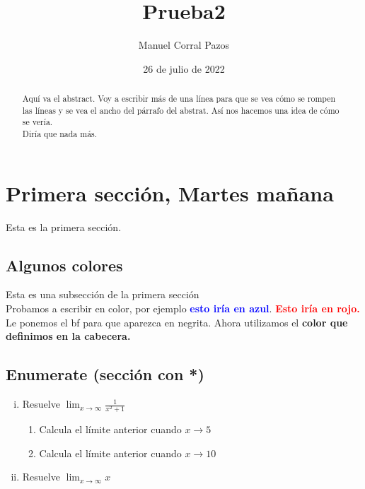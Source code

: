 \documentclass[10pt,a4paper]{article}
\title{Prueba2}
\author{Manuel Corral Pazos}
\date{26 de julio de 2022}
\begin{document}
\maketitle

\begin{abstract}
	\noindent Aquí va el abstract. Voy a escribir más de una línea para que se vea cómo se rompen las líneas y se vea el ancho del párrafo del abstrat. Así nos hacemos una idea de cómo se vería.\\
	Diría que nada más.
\end{abstract}

\section[Martes mañana]{Primera sección, Martes mañana}
Esta es la primera sección.
\subsection[Colores]{Algunos colores}
Esta es una subsección de la primera sección\\
Probamos a escribir en color, por ejemplo \textcolor{blue}{\bf esto iría en azul}. \textcolor{red}{\bf Esto iría en rojo.} Le ponemos el bf para que aparezca en negrita. Ahora utilizamos el \textcolor{moradito}{\bf color que definimos en la cabecera.}

\subsection*{Enumerate (sección con *)}

\begin{enumerate}[i).-]
	\item Resuelve $\lim_{x\to \infty}\frac{1}{x^2+1}$
	\begin{enumerate}[1;]
		\item Calcula el límite anterior cuando $x\to 5$
		\item Calcula el límite anterior cuando $x\to 10$
	\end{enumerate} 
	\item Resuelve $\lim_{x\to \infty} x$
\end{enumerate}
\end{document}
